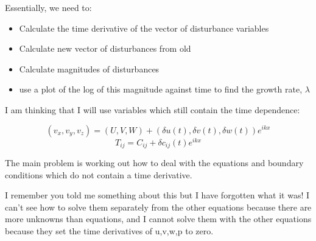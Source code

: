\documentclass[12pt,a4paper]{article}
\newcommand{\su}{\delta u}
\newcommand{\sv}{\delta v}
\newcommand{\sw}{\delta w}
\begin{document}
\noindent Essentially, we need to:
\begin{itemize}
    \item Calculate the time derivative of the vector of disturbance variables 
    \item Calculate new vector of disturbances from old
    \item Calculate magnitudes of disturbances
    \item use a plot of the log of this magnitude against time to find the growth rate, $\lambda$ 
\end{itemize}

I am thinking that I will use variables which still contain the time dependence:

\begin{equation}
 (v_{x}, v_{y}, v_{z}) = (U,V,W) + (\su(t), \sv(t), \sw(t))e^{ikx}
\end{equation}
\begin{equation}
    T_{ij} = C_{ij} + \delta c_{ij}(t) e^{ikx} 
\end{equation}
 

The main problem is working out how to deal with the equations and boundary conditions which do not contain a time derivative.

I remember you told me something about this but I have forgotten what it was! I can't see how to solve them separately from the other equations because there are more unknowns than equations, and I cannot solve them with the other equations because they set the time derivatives of u,v,w,p to zero.

\end{document}
